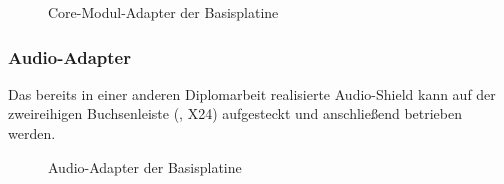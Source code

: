 \begin{figure}[htb]
    \centering
    \qquad
    \qquad
    \caption[Core-Modul-Adapter der Basisplatine]{\gls{Core-Modul}-Adapter der \gls{Basisplatine}}
    \label{fig:basisplatine-core}
\end{figure}

\subsubsection{Audio-Adapter}
Das bereits in einer anderen Diplomarbeit realisierte Audio-Shield kann auf der zweireihigen Buchsenleiste (, X24) aufgesteckt und anschließend betrieben werden.

\begin{figure}[htb]
    \centering
    \qquad
    \qquad
    \caption[Audio-Adapter der Basisplatine]{Audio-Adapter der \gls{Basisplatine}}
    \label{fig:basisplatine-audio}
\end{figure}

